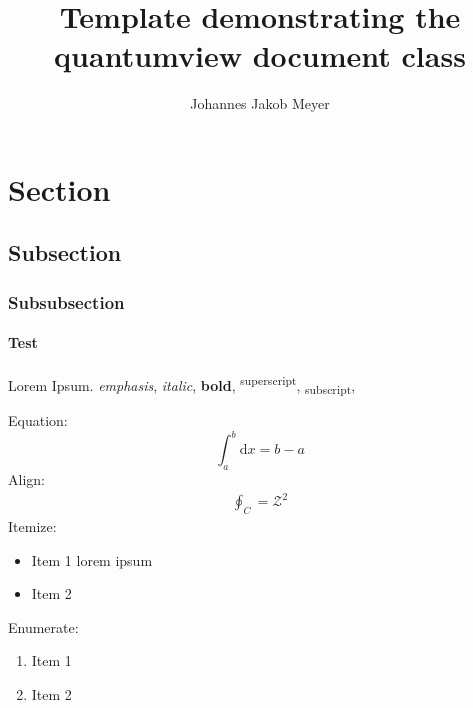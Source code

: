 \documentclass[html]{quantumview}
\begin{document}
\title{Template demonstrating the quantumview document class}

\author{Johannes Jakob Meyer}

\maketitle

\section{Section}
\subsection{Subsection}
\subsubsection{Subsubsection}
\paragraph{Test}
Lorem Ipsum. \emph{emphasis}, \textit{italic}, \textbf{bold}, \textsuperscript{superscript}, \textsubscript{subscript}, \cite{test}

Equation:
\begin{equation}
    \int_a^b \mathrm{d}x = b-a
\end{equation}
Align:
\begin{align}
    \oint_C = \mathcal{Z}^2
\end{align}
Itemize:
\begin{itemize}
    \item Item 1 lorem ipsum
    \item Item 2
\end{itemize}
Enumerate:
\begin{enumerate}
    \item Item 1
    \item Item 2
\end{enumerate}
\end{document}
